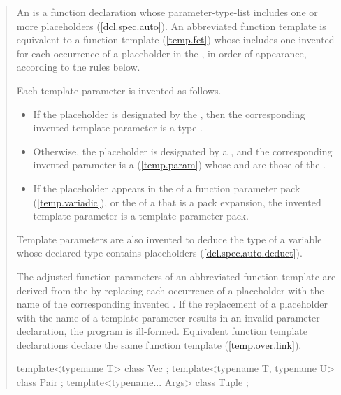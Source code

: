 \begin{quote}
\pnum
An  is a function declaration whose
parameter-type-list includes one or more placeholders (\ref{dcl.spec.auto}).
% 
An abbreviated function template is equivalent to a function template
(\ref{temp.fct}) whose 
includes one invented  for each occurrence 
of a placeholder in the ,
in order of appearance, according to the rules below.

\pnum
Each template parameter is invented as follows.
\begin{itemize}
\item If the placeholder is designated by the 
, then the corresponding invented template 
parameter is a type .

\item Otherwise, the placeholder is designated by a 
, and the corresponding invented 
parameter is a  (\ref{temp.param}) whose 
 and  
are those of the .

\item If the placeholder appears in the  of a 
function parameter pack (\ref{temp.variadic}), or the 
 of a  that is a pack 
expansion, the invented template parameter is a 
template parameter pack.
\end{itemize}
\enternote
Template parameters are also invented to deduce the type of a variable
whose declared type contains placeholders (\ref{dcl.spec.auto.deduct}).
\exitnote

\pnum 
The adjusted function parameters of an abbreviated function template are derived
from the  by replacing each 
occurrence of a placeholder with the name of the corresponding invented 
.
% 
If the replacement of a placeholder with the name of a template parameter
results in an invalid parameter declaration, the program is ill-formed.
% 
\enternote
Equivalent function template declarations declare the same function template
(\ref{temp.over.link}).
\exitnote
% 
\enterexample
\begin{codeblock}
template<typename T> class Vec { };
template<typename T, typename U> class Pair { };
template<typename... Args> class Tuple { };


\end{codeblock}
\end{quote}
